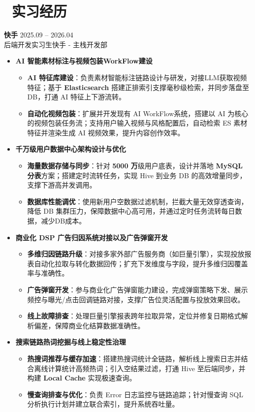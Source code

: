 \documentclass[11pt]{article}
\newlength{\intraProjectTitleSep}
\newcommand{\titlebreak}{\\[\intraProjectTitleSep]}
\newlength{\intraProjectListTopSep}
\begin{document}
\section{\makebox[\widthof{\faUsers}][c]{\color{CVBlue}\faUsers}\ 实习经历}

\textbf{快手} \hfill 2025.09 -- 2026.04 \titlebreak
后端开发实习生\quad 快手 - 主栈开发部
\begin{itemize}[nosep, topsep=\intraProjectListTopSep]
  \item \textbf{AI 智能素材标注与视频包装WorkFlow建设}
  \begin{itemize}[nosep]
    \item \textbf{AI 特征库建设}：负责素材智能标注链路设计与研发，对接LLM获取视频特征；基于 \textbf{Elasticsearch} 搭建正排索引支撑毫秒级检索，并同步落盘至 DB，打通 AI 特征上下游流转。
    \item \textbf{自动化视频包装}：扩展并开发现有 AI WorkFlow系统，搭建以 AI 为核心的视频包装任务流；支持用户输入视频与风格配置后，自动检索 ES 素材特征并渲染生成 AI 视频效果，提升内容创作效率。
  \end{itemize}
  \item \textbf{千万级用户数据中心架构设计与优化}
  \begin{itemize}[nosep]
    \item \textbf{海量数据存储与同步}：针对 \textbf{5000 万}级用户底表，设计并落地 \textbf{MySQL 分表}方案；搭建定时流转任务，实现 Hive 到业务 DB 的高效增量同步，支撑下游高并发调用。
    \item \textbf{数据库性能调优}：使用新用户空数据过滤机制，拦截大量无效穿透查询，降低 DB 集群压力，保障数据中心高可用，并通过定时任务流转每日数据，减少DB成本。
  \end{itemize}
  \item \textbf{商业化 DSP 广告归因系统对接以及广告弹窗开发}
  \begin{itemize}[nosep]
    \item \textbf{多维归因链路升级}：对接多家外部广告服务商（如巨量引擎），实现投放报表自动化拉取与转化数据回传；扩充下发维度与字段，提升多维归因覆盖率与准确性。
    \item \textbf{广告弹窗开发}：参与商业化广告弹窗能力建设，完成弹窗策略下发、展示频控与曝光/点击回调链路对接，支撑广告位灵活配置与投放效果回收。
    \item \textbf{线上故障排查}：处理巨量引擎报表跨年拉取异常，定位并修复日期格式解析偏差，保障商业化结算数据准确性。
  \end{itemize}
  \item \textbf{搜索链路热词挖掘与线上稳定性治理}
  \begin{itemize}[nosep]
    \item \textbf{热搜词推荐与缓存加速}：搭建热搜词统计全链路，解析线上搜索日志并结合离线计算统计高频热词；引入空结果过滤，打通 Hive 至后端同步，并构建 \textbf{Local Cache} 实现极速查询。
    \item \textbf{慢查询排查与优化}：负责 Error 日志监控与链路追踪；针对慢查询 SQL 分析执行计划并建立联合索引，提升系统吞吐量。
  \end{itemize}
\end{itemize}
\end{document}
